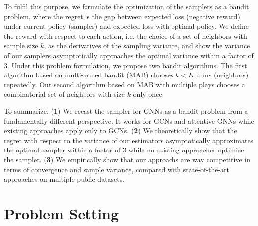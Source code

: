 \documentclass{article}
\begin{document}
To fulfil this purpose, we formulate the optimization
of the samplers as a bandit problem, where
the regret is the gap between expected
loss (negative reward) under current policy (sampler) and expected
loss with optimal policy. We define the reward 
with respect to each action, i.e. the choice 
of a set of neighbors with sample size $k$,
as the derivatives of the sampling variance, and show
the variance of our samplers asymptotically approaches
the optimal variance within a factor of $3$.
Under this problem formulation, we propose two bandit algorithms.
The first algorithm based on multi-armed bandit (MAB) chooses 
$k < K$ arms (neighbors) repeatedly.
Our second algorithm based on MAB with multiple plays
chooses a combinatorial set of neighbors with size $k$ only once.


To summarize,
(\textbf{1}) We recast the sampler for GNNs as a bandit 
problem from a fundamentally different perspective. It works
for GCNs and attentive GNNs while existing approaches apply
only to GCNs.
(\textbf{2}) We theoretically show that the regret with 
respect to the variance of our estimators asymptotically 
approximates the optimal sampler within a factor of 3 while
no existing approaches optimize the sampler. 
(\textbf{3}) We empirically show that our approachs are way competitive in
terms of convergence and sample variance, compared with 
state-of-the-art approaches on multiple public datasets.

\section{Problem Setting}
\end{document}
